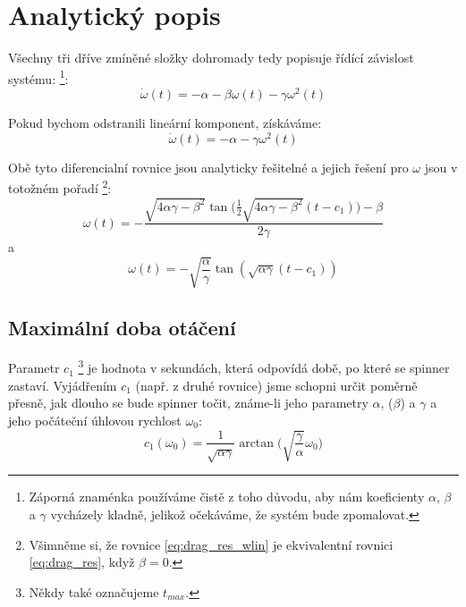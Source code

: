 \section{Analytický popis}

Všechny tři dříve zmíněné složky dohromady tedy popisuje řídící závislost systému: \footnote{Záporná znaménka používáme čistě z toho důvodu, aby nám koeficienty $\alpha$, $\beta$ a $\gamma$ vycházely kladně, jelikož očekáváme, že systém bude zpomalovat.}:
\begin{equation}
    \label{eq:drag_diff_wlin}
    \dot{\omega}(t) = - \alpha - \beta \omega(t) - \gamma \omega^2(t)
\end{equation}

Pokud bychom odstranili lineární komponent, získáváme:
\begin{equation}
    \label{eq:drag_diff}
    \dot{\omega}(t) = - \alpha - \gamma \omega^2(t)
\end{equation}

Obě tyto diferencialní rovnice jsou analyticky řešitelné a jejich řešení pro $\omega$ jsou v totožném pořadí \footnote{Všimněme si, že rovnice \ref{eq:drag_res_wlin} je ekvivalentní rovnici \ref{eq:drag_res}, když $\beta = 0$.}:
\begin{equation}
    \label{eq:drag_res_wlin}
    \omega(t) = -\frac{\sqrt{4\alpha\gamma - \beta^2} \tan{(\frac{1}{2}\sqrt{4\alpha\gamma - \beta^2}(t-c_1)})-\beta}{2\gamma}
\end{equation}
a
\begin{equation}
    \label{eq:drag_res}
    \omega(t) = -\sqrt{\frac{\alpha}{\gamma}} \tan{(\sqrt{\alpha\gamma}(t-c_1))}
\end{equation}

\subsection{Maximální doba otáčení}

Parametr $c_1$ \footnote{Někdy také označujeme $t_{max}$.} je hodnota v sekundách, která odpovídá době, po které se spinner zastaví. Vyjádřením $c_1$ (např. z druhé rovnice) jsme schopni určit poměrně přesně, jak dlouho se bude spinner točit, známe-li jeho parametry $\alpha$, ($\beta$) a $\gamma$ a jeho počáteční úhlovou rychlost $\omega_0$:
\begin{equation}
    \label{eq:runtime_from_omeg0}
    c_1(\omega_0) = \frac{1}{\sqrt{\alpha\gamma}} \arctan{ \bigg( \sqrt{\frac{\gamma}{\alpha}} \omega_0 \bigg)}
\end{equation}

